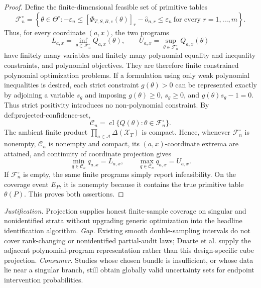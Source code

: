 \documentclass{article}
\begin{document}
\begin{proof}
Define the finite-dimensional feasible set of primitive tables
\[
\mathcal F_n^\circ=
\left\{\theta\in\Theta^\circ:
-\varepsilon_n\leq
[\Phi_{T,S,B,e}(\theta)]_r-\widehat o_{n,r}
\leq\varepsilon_n\ \text{for every }r=1,\ldots,m
\right\}.
\]
Thus, for every coordinate \((a,x)\), the two programs
\[
L_{a,x}=\inf_{\theta\in\mathcal F_n^\circ}Q_{a,x}(\theta),
\qquad
U_{a,x}=\sup_{\theta\in\mathcal F_n^\circ}Q_{a,x}(\theta)
\]
have finitely many variables and finitely many polynomial equality and inequality constraints, and polynomial objectives.  They are therefore finite constrained polynomial optimization problems.
If a formulation using only weak polynomial inequalities is desired, each strict constraint \(g(\theta)>0\) can be represented exactly by adjoining a variable \(s_g\) and imposing \(g(\theta)\geq0\), \(s_g\geq0\), and \(g(\theta)s_g-1=0\).  Thus strict positivity introduces no non-polynomial constraint.
By \(\text{def:projected-confidence-set}\),
\[
\mathcal C_n=\operatorname{cl}\{Q(\theta):\theta\in\mathcal F_n^\circ\}.
\]
The ambient finite product \(\prod_{a\in\mathcal A}\Delta(\mathcal X_T)\) is compact.  Hence, whenever \(\mathcal F_n^\circ\) is nonempty, \(\mathcal C_n\) is nonempty and compact, its \((a,x)\)-coordinate extrema are attained, and continuity of coordinate projection gives
\[
\min_{q\in\mathcal C_n}q_{a,x}=L_{a,x},
\qquad
\max_{q\in\mathcal C_n}q_{a,x}=U_{a,x}.
\]
If \(\mathcal F_n^\circ\) is empty, the same finite programs simply report infeasibility.  On the coverage event \(E_P\), it is nonempty because it contains the true primitive table \(\theta(P)\).  This proves both assertions.
\end{proof}
\par\smallskip\noindent \textit{Justification.} Projection supplies honest finite-sample coverage on singular and nonidentified strata without upgrading generic optimization into the headline identification algorithm. \textit{Gap.} Existing smooth double-sampling intervals do not cover rank-changing or nonidentified partial-audit laws; Duarte et al. supply the adjacent polynomial-program representation rather than this design-specific cube projection. \textit{Consumer.} Studies whose chosen bundle is insufficient, or whose data lie near a singular branch, still obtain globally valid uncertainty sets for endpoint intervention probabilities.
\end{document}
